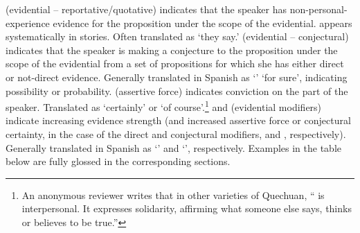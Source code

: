  (evidential -- reportative/quotative) indicates that the speaker has non-perso\-nal-experience evidence for the proposition under the scope of the evidential.  appears systematically in stories. Often translated as `they say.'  (evidential -- conjectural) indicates that the speaker is making a conjecture to the proposition under the scope of the evidential from a set of propositions for which she has either direct or not-direct evidence. Generally translated in Spanish as `' `for sure', indicating possibility or probability.  (assertive force) indicates conviction on the part of the speaker. Translated as `certainly' or `of course'.\footnote{An anonymous reviewer writes that in other varieties of Quechuan, `` is interpersonal. It expresses solidarity, affirming what someone else says, thinks or believes to be true.''}  and  (evidential modifiers) indicate increasing evidence strength (and increased assertive force or conjectural certainty, in the case of the direct and conjectural modifiers,  and , respectively). Generally translated in Spanish as `' and `', respectively. Examples in the table below are fully glossed in the corresponding sections.

